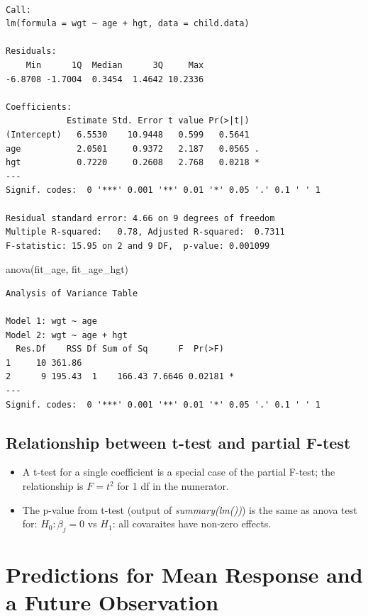 \documentclass[
  letterpaper,
  DIV=11,
  numbers=noendperiod]{scrreprt}
\newenvironment{Shaded}{\begin{snugshade}}{\end{snugshade}}
\newcommand{\FunctionTok}[1]{\textcolor[rgb]{0.28,0.35,0.67}{#1}}
\newcommand{\NormalTok}[1]{\textcolor[rgb]{0.00,0.23,0.31}{#1}}
\providecommand{\tightlist}{%
  \setlength{\itemsep}{0pt}\setlength{\parskip}{0pt}}\usepackage{longtable,booktabs,array}
\begin{document}
\begin{verbatim}

Call:
lm(formula = wgt ~ age + hgt, data = child.data)

Residuals:
    Min      1Q  Median      3Q     Max 
-6.8708 -1.7004  0.3454  1.4642 10.2336 

Coefficients:
            Estimate Std. Error t value Pr(>|t|)  
(Intercept)   6.5530    10.9448   0.599   0.5641  
age           2.0501     0.9372   2.187   0.0565 .
hgt           0.7220     0.2608   2.768   0.0218 *
---
Signif. codes:  0 '***' 0.001 '**' 0.01 '*' 0.05 '.' 0.1 ' ' 1

Residual standard error: 4.66 on 9 degrees of freedom
Multiple R-squared:   0.78, Adjusted R-squared:  0.7311 
F-statistic: 15.95 on 2 and 9 DF,  p-value: 0.001099
\end{verbatim}

\begin{Shaded}
\begin{Highlighting}[]
\FunctionTok{anova}\NormalTok{(fit\_age, fit\_age\_hgt)}
\end{Highlighting}
\end{Shaded}

\begin{verbatim}
Analysis of Variance Table

Model 1: wgt ~ age
Model 2: wgt ~ age + hgt
  Res.Df    RSS Df Sum of Sq      F  Pr(>F)  
1     10 361.86                              
2      9 195.43  1    166.43 7.6646 0.02181 *
---
Signif. codes:  0 '***' 0.001 '**' 0.01 '*' 0.05 '.' 0.1 ' ' 1
\end{verbatim}

\subsection{Relationship between t-test and partial
F-test}\label{relationship-between-t-test-and-partial-f-test}

\begin{itemize}
\tightlist
\item
  A t-test for a single coefficient is a special case of the partial
  F-test; the relationship is \(F = t^2\) for 1 df in the numerator.
\item
  The p-value from t-test (output of \emph{summary(lm())}) is the same
  as anova test for: \(H_0: \beta_j = 0\) vs \(H_1\): all covaraites
  have non-zero effects.
\end{itemize}

\section{Predictions for Mean Response and a Future
Observation}\label{predictions-for-mean-response-and-a-future-observation}
\end{document}
